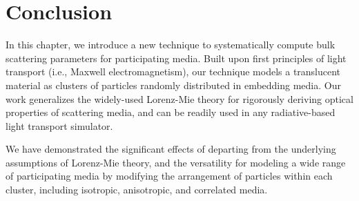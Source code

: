 \section{Conclusion}
\label{sec:waveoptics:conclusion}

In this chapter, we introduce a new technique to systematically compute bulk scattering parameters for participating media. Built upon first principles of light transport (i.e., Maxwell electromagnetism), our technique models a translucent material as clusters of particles randomly distributed in embedding media. Our work generalizes the widely-used Lorenz-Mie theory for rigorously deriving optical properties of scattering media, and can be readily used in any radiative-based light transport simulator. 

We have demonstrated the significant effects of departing from the underlying assumptions of Lorenz-Mie theory, and the versatility for modeling a wide range of participating media by modifying the arrangement of particles within each cluster, including isotropic, anisotropic, and correlated media.
